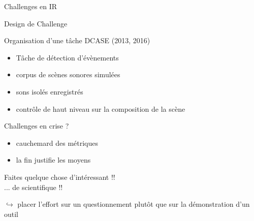 \begin{frame}{Challenges en IR}
\begin{center}
\end{center}
\vspace{.8cm}
\end{frame}

\begin{frame}{Design de Challenge}
\begin{block}{Organisation d'une tâche DCASE (2013, 2016)}
\begin{itemize}
\item Tâche de détection d'évènements
\item corpus de scènes sonores simulées
\item sons isolés enregistrés
\item contrôle de haut niveau sur la composition de la scène
\end{itemize}
\end{block} 
\end{frame}

\begin{frame}{Challenges en crise ?}
\begin{itemize}
    \item cauchemard des métriques
    \item \og la fin justifie les moyens \fg
\end{itemize}
\vspace{.8cm}
\begin{center}
\og Faites quelque chose d'intéressant !! \fg \\ 
\og ... de scientifique !! \fg
\end{center}
\vspace{.8cm}
$\hookrightarrow{}$ placer l'effort sur un questionnement plutôt que sur la démonstration d'un outil
\end{frame}


